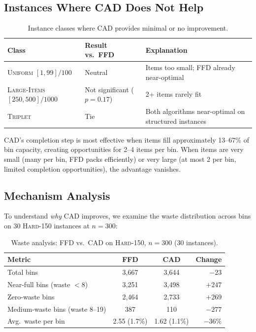 \documentclass[11pt]{article}
\begin{document}
\subsection{Instances Where CAD Does Not Help}

\begin{table}[h]
\centering
\caption{Instance classes where CAD provides minimal or no improvement.}
\label{tab:noimprove}
\begin{tabular}{lll}
\toprule
\textbf{Class} & \textbf{Result vs.\ FFD} & \textbf{Explanation} \\
\midrule
\textsc{Uniform} $[1,99]/100$  & Neutral & Items too small; FFD already near-optimal \\
\textsc{Large-Items} $[250,500]/1000$ & Not significant ($p = 0.17$) & 2+ items rarely fit \\
\textsc{Triplet}               & Tie & Both algorithms near-optimal on structured instances \\
\bottomrule
\end{tabular}
\end{table}

CAD's completion step is most effective when items fill approximately 13--67\% of
bin capacity, creating opportunities for 2--4 items per bin. When items are very
small (many per bin, FFD packs efficiently) or very large (at most 2 per bin,
limited completion opportunities), the advantage vanishes.

\subsection{Mechanism Analysis}

To understand \emph{why} CAD improves, we examine the waste distribution across bins
on 30 \textsc{Hard-150} instances at $n = 300$:

\begin{table}[h]
\centering
\caption{Waste analysis: FFD vs.\ CAD on \textsc{Hard-150}, $n = 300$ (30 instances).}
\label{tab:mechanism}
\begin{tabular}{lccr}
\toprule
\textbf{Metric} & \textbf{FFD} & \textbf{CAD} & \textbf{Change} \\
\midrule
Total bins          & 3{,}667 & 3{,}644 & $-23$ \\
Near-full bins (waste $< 8$) & 3{,}251 & 3{,}498 & $+247$ \\
Zero-waste bins     & 2{,}464 & 2{,}733 & $+269$ \\
Medium-waste bins (waste 8--19) & 387 & 110 & $-277$ \\
Avg.\ waste per bin & 2.55 (1.7\%) & 1.62 (1.1\%) & $-36\%$ \\
\bottomrule
\end{tabular}
\end{table}
\end{document}
